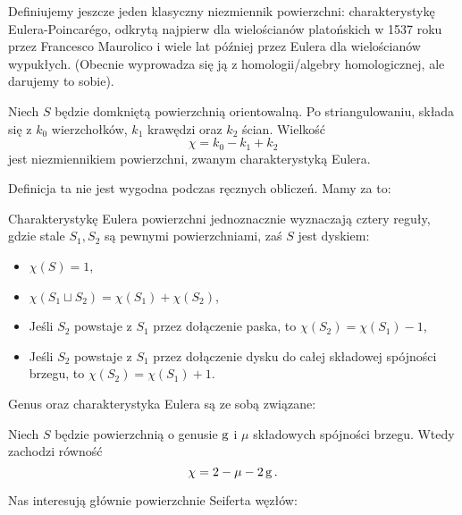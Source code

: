 Definiujemy jeszcze jeden klasyczny niezmiennik powierzchni: charakterystykę Eulera-Poincarégo, odkrytą najpierw dla wielościanów platońskich w 1537 roku przez Francesco Maurolico i wiele lat później przez Eulera dla wielościanów wypukłych.
(Obecnie wyprowadza się ją z homologii/algebry homologicznej, ale darujemy to sobie).

\begin{definition}
%
    Niech $S$ będzie domkniętą powierzchnią orientowalną.
    Po striangulowaniu, składa się z $k_0$ wierzchołków, $k_1$ krawędzi oraz $k_2$ ścian.
    Wielkość
    \begin{equation}
        \chi = k_0 - k_1 + k_2
    \end{equation}
    jest niezmiennikiem powierzchni, zwanym charakterystyką Eulera.
\end{definition}

Definicja ta nie jest wygodna podczas ręcznych obliczeń.
Mamy za to:

\begin{proposition}
    Charakterystykę Eulera powierzchni jednoznacznie wyznaczają cztery reguły, gdzie stale $S_1, S_2$ są pewnymi powierzchniami, zaś $S$ jest dyskiem:
    \begin{itemize}
        \item $\chi(S) = 1$,
        \item $\chi(S_1 \sqcup S_2) = \chi(S_1) + \chi(S_2)$,
        \item Jeśli $S_2$ powstaje z $S_1$ przez dołączenie paska, to $\chi(S_2) = \chi(S_1) - 1$,
        \item Jeśli $S_2$ powstaje z $S_1$ przez dołączenie dysku do całej składowej spójności brzegu, to $\chi(S_2) = \chi(S_1) + 1$.
    \end{itemize}
\end{proposition}

Genus oraz charakterystyka Eulera są ze sobą związane:

\begin{proposition}
    Niech $S$ będzie powierzchnią o genusie $\operatorname{g}$ i $\mu$ składowych spójności brzegu.
    Wtedy zachodzi równość
    \begin{equation}
        \chi = 2 - \mu - 2\operatorname{g}.
    \end{equation}
\end{proposition}

Nas interesują głównie powierzchnie Seiferta węzłów:
%

